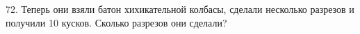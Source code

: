 72. Теперь они взяли батон хихикательной колбасы, сделали несколько разрезов и получили 10 кусков. Сколько разрезов они сделали?\\
